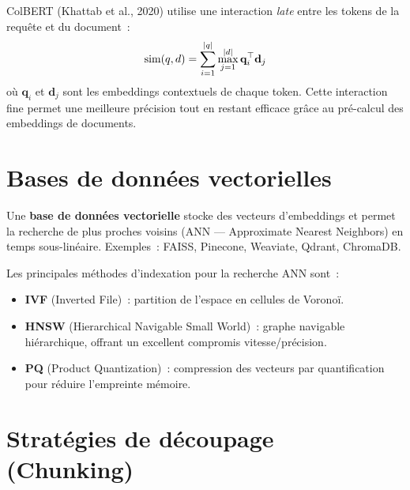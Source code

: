 \begin{definition}[ColBERT]
ColBERT (Khattab et al., 2020) utilise une interaction \emph{late} entre
les tokens de la requ\^ete et du document~:
\[
    \text{sim}(q, d) = \sum_{i=1}^{\left| q \right|} \max_{j=1}^{\left| d \right|}
    \mathbf{q}_i^\top \mathbf{d}_j
\]
o\`u $\mathbf{q}_i$ et $\mathbf{d}_j$ sont les embeddings contextuels
de chaque token. Cette interaction fine permet une meilleure pr\'ecision
tout en restant efficace gr\^ace au pr\'e-calcul des embeddings de documents.
\end{definition}

\section{Bases de donn\'ees vectorielles}
\label{sec:rag:vectordb}

\begin{definition}
Une \textbf{base de donn\'ees vectorielle} stocke des vecteurs
d'embeddings et permet la recherche de plus proches voisins (ANN ---
Approximate Nearest Neighbors) en temps sous-lin\'eaire. Exemples~:
FAISS, Pinecone, Weaviate, Qdrant, ChromaDB.
\end{definition}

\begin{proposition}
Les principales m\'ethodes d'indexation pour la recherche ANN sont~:
\begin{itemize}
    \item \textbf{IVF} (Inverted File)~: partition de l'espace en
    cellules de Vorono\"i.
    \item \textbf{HNSW} (Hierarchical Navigable Small World)~: graphe
    navigable hi\'erarchique, offrant un excellent compromis
    vitesse/pr\'ecision.
    \item \textbf{PQ} (Product Quantization)~: compression des vecteurs
    par quantification pour r\'eduire l'empreinte m\'emoire.
\end{itemize}
\end{proposition}

\section{Strat\'egies de d\'ecoupage (Chunking)}
\label{sec:rag:chunking}

